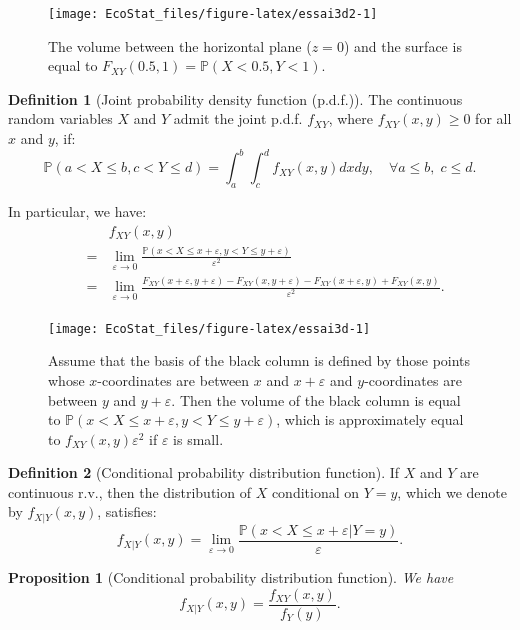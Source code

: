 \documentclass[
  12pt,
]{book}
\newtheorem{proposition}{Proposition}[chapter]
\theoremstyle{definition}
\newtheorem{definition}{Definition}[chapter]
\theoremstyle{definition}
\theoremstyle{definition}
\theoremstyle{definition}
\theoremstyle{remark}
\begin{document}
\begin{figure}
\texttt{[image: EcoStat\_files/figure-latex/essai3d2-1]} \caption{The volume between the horizontal plane ($z=0$) and the surface is equal to $F_{XY}(0.5,1)=\mathbb{P}(X<0.5,Y<1)$.}\label{fig:essai3d2}
\end{figure}

\begin{definition}[Joint probability density function (p.d.f.)]
\protect\hypertarget{def:jointpdf}{}\label{def:jointpdf}The continuous random variables \(X\) and \(Y\) admit the joint p.d.f. \(f_{XY}\), where \(f_{XY}(x,y) \ge 0\) for all \(x\) and \(y\), if:
\[
\mathbb{P}(a < X \le b,c < Y \le d) = \int_{a}^{b}\int_{c}^{d}f_{XY}(x,y)dx dy, \quad \forall a \le b,\;c \le d.
\]
\end{definition}

In particular, we have:
\begin{eqnarray*}
&&f_{XY}(x,y)\\
&=& \lim_{\varepsilon \rightarrow 0} \frac{\mathbb{P}(x < X \le x + \varepsilon,y < Y \le y + \varepsilon)}{\varepsilon^2} \\
&=& \lim_{\varepsilon \rightarrow 0} \frac{F_{XY}(x + \varepsilon,y + \varepsilon)-F_{XY}(x,y + \varepsilon)-F_{XY}(x + \varepsilon,y)+F_{XY}(x,y)}{\varepsilon^2}.
\end{eqnarray*}

\begin{figure}
\texttt{[image: EcoStat\_files/figure-latex/essai3d-1]} \caption{Assume that the basis of the black column is defined by those points whose $x$-coordinates are between $x$ and $x+\varepsilon$ and $y$-coordinates are between $y$ and $y+\varepsilon$. Then the volume of the black column is equal to $\mathbb{P}(x < X \le x+\varepsilon,y < Y \le y+\varepsilon)$, which is approximately equal to $f_{XY}(x,y)\varepsilon^2$ if $\varepsilon$ is small.}\label{fig:essai3d}
\end{figure}

\begin{definition}[Conditional probability distribution function]
\protect\hypertarget{def:condcdf}{}\label{def:condcdf}If \(X\) and \(Y\) are continuous r.v., then the distribution of \(X\) conditional on \(Y=y\), which we denote by \(f_{X|Y}(x,y)\), satisfies:
\[
f_{X|Y}(x,y)=\lim_{\varepsilon \rightarrow 0} \frac{\mathbb{P}(x < X \le x + \varepsilon|Y=y)}{\varepsilon}.
\]
\end{definition}

\begin{proposition}[Conditional probability distribution function]
\protect\hypertarget{prp:condcdf}{}\label{prp:condcdf}We have
\[
f_{X|Y}(x,y)=\frac{f_{XY}(x,y)}{f_Y(y)}.
\]
\end{proposition}
\end{document}
